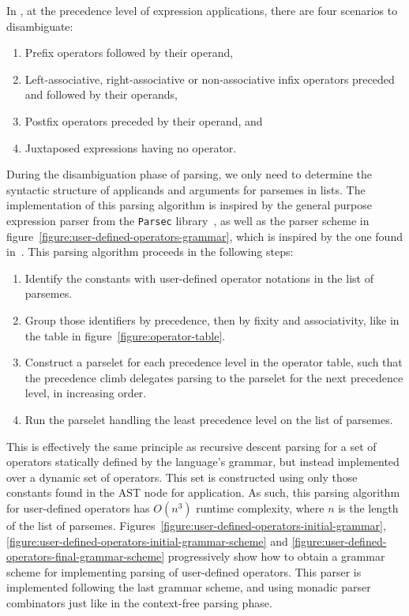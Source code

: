 In \Beluga, at the precedence level of expression applications, there are four scenarios to disambiguate:
\begin{enumerate}
\item Prefix operators followed by their operand,
\item Left-associative, right-associative or non-associative infix operators preceded and followed by their operands,
\item Postfix operators preceded by their operand, and
\item Juxtaposed expressions having no operator.
\end{enumerate}

During the disambiguation phase of parsing, we only need to determine the syntactic structure of applicands and arguments for parsemes in lists.
The implementation of this parsing algorithm is inspired by the general purpose expression parser from the \texttt{Parsec} library~\cite{leijen2001parsec}, as well as the parser scheme in figure~\ref{figure:user-defined-operators-grammar}, which is inspired by the one found in~\cite{danielsson2008parsing}.
This parsing algorithm proceeds in the following steps:
\begin{enumerate}
\item Identify the constants with user-defined operator notations in the list of parsemes.
\item Group those identifiers by precedence, then by fixity and associativity, like in the table in figure~\ref{figure:operator-table}.
\item Construct a parselet for each precedence level in the operator table, such that the precedence climb delegates parsing to the parselet for the next precedence level, in increasing order.
\item Run the parselet handling the least precedence level on the list of parsemes.
\end{enumerate}
This is effectively the same principle as recursive descent parsing for a set of operators statically defined by the language's grammar, but instead implemented over a dynamic set of operators.
This set is constructed using only those constants found in the \ac{AST} node for application.
As such, this parsing algorithm for user-defined operators has $ O(n^3) $ runtime complexity, where $ n $ is the length of the list of parsemes.
Figures~\ref{figure:user-defined-operators-initial-grammar}, \ref{figure:user-defined-operators-initial-grammar-scheme} and \ref{figure:user-defined-operators-final-grammar-scheme} progressively show how to obtain a grammar scheme for implementing parsing of user-defined operators.
This parser is implemented following the last grammar scheme, and using monadic parser combinators just like in the context-free parsing phase.

